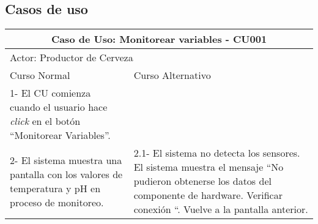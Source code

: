     \subsection{Casos de uso}
    \begin{table}[H]
    
    \begin{center}
    \begin{tabularx}{\textwidth}{ | X | X |}
        \hline
        \multicolumn{2}{|c|}{\textbf{Caso de Uso: Monitorear variables - CU001}} \\
        \hline
        \multicolumn{2}{|l|}{Actor: Productor de Cerveza} \\
        \hline
        Curso Normal & Curso Alternativo \\
        \hline
        1- El CU comienza cuando el usuario hace \textit{click} en el botón “Monitorear Variables”. & \\
        \hline
        2- El sistema muestra una pantalla con los valores de temperatura y pH en proceso de monitoreo. & 2.1- El sistema no detecta los sensores. 
        El sistema muestra el mensaje “No pudieron obtenerse los datos del componente de hardware. Verificar conexión “. Vuelve a la pantalla anterior.
        \\
        \hline
    \end{tabularx}
    \label{CU001a}
    \end{center}
    \end{table}
        
%        

